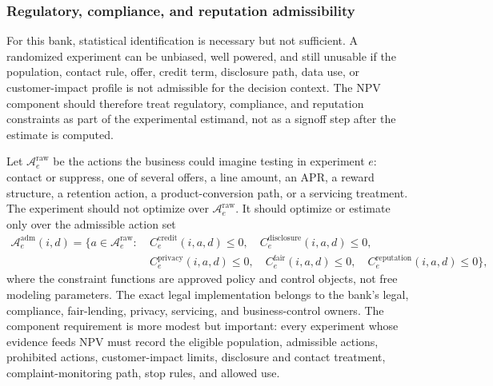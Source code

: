\documentclass[11pt]{article}
\newcommand{\1}{\mathbf{1}}
\begin{document}
\subsubsection{Regulatory, compliance, and reputation admissibility}

For this bank, statistical identification is necessary but not sufficient. A
randomized experiment can be unbiased, well powered, and still unusable if the
population, contact rule, offer, credit term, disclosure path, data use, or
customer-impact profile is not admissible for the decision context. The NPV
component should therefore treat regulatory, compliance, and reputation
constraints as part of the experimental estimand, not as a signoff step after
the estimate is computed.

Let $\mathcal{A}^{\mathrm{raw}}_e$ be the actions the business could imagine
testing in experiment $e$: contact or suppress, one of several offers, a line
amount, an APR, a reward structure, a retention action, a product-conversion
path, or a servicing treatment. The experiment should not optimize over
$\mathcal{A}^{\mathrm{raw}}_e$. It should optimize or estimate only over the
admissible action set
\begin{align}
  \mathcal{A}^{\mathrm{adm}}_e(i,d)
  =
  \{a\in\mathcal{A}^{\mathrm{raw}}_e:\ 
    &C^{\mathrm{credit}}_e(i,a,d)\le 0,\quad
     C^{\mathrm{disclosure}}_e(i,a,d)\le 0,\nonumber\\
    &C^{\mathrm{privacy}}_e(i,a,d)\le 0,\quad
     C^{\mathrm{fair}}_e(i,a,d)\le 0,\quad
     C^{\mathrm{reputation}}_e(i,a,d)\le 0\},
  \label{eq:admissible-action-set}
\end{align}
where the constraint functions are approved policy and control objects, not
free modeling parameters. The exact legal implementation belongs to the bank's
legal, compliance, fair-lending, privacy, servicing, and business-control
owners. The component requirement is more modest but important: every
experiment whose evidence feeds NPV must record the eligible population,
admissible actions, prohibited actions, customer-impact limits, disclosure and
contact treatment, complaint-monitoring path, stop rules, and allowed use.
\end{document}
